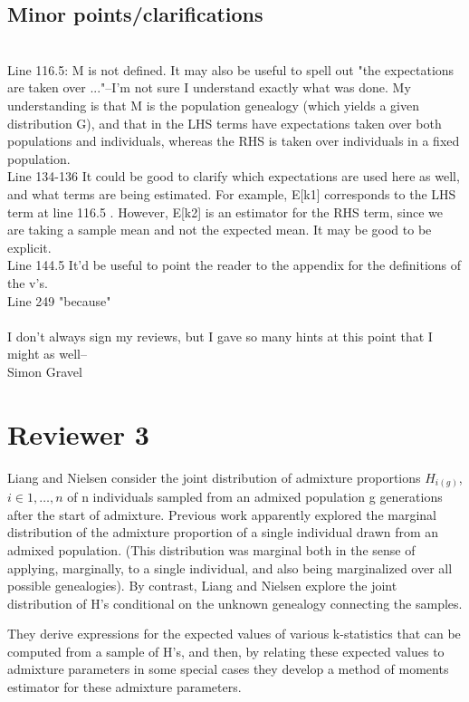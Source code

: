 \documentclass[11pt]{amsart}
\begin{document}
\subsection*{Minor points/clarifications}\ \\
Line 116.5: M is not defined. It may also be useful to spell out "the expectations are taken over ..."--I'm not
sure I understand exactly what was done. My understanding is that M is the population genealogy (which
yields a given distribution G), and that in the LHS terms have expectations taken over both populations and
individuals, whereas the RHS is taken over individuals in a fixed population.\\
Line 134-136
It could be good to clarify which expectations are used here as well, and what terms are being estimated.
For example, E[k1] corresponds to the LHS term at line 116.5 . However, E[k2] is an estimator for the RHS
term, since we are taking a sample mean and not the expected mean. It may be good to be explicit.\\
Line 144.5
It'd be useful to point the reader to the appendix for the definitions of the v's.\\
Line 249 "because"\\
\\
I don't always sign my reviews, but I gave so many hints at this point that I might as well--\\
Simon Gravel

\section{Reviewer 3}
Liang and Nielsen consider the joint distribution of admixture proportions $H_{i(g)}$, $i\in 1,\ldots, n$ of
n individuals sampled from an admixed population g generations after the start of admixture. Previous
work apparently explored the marginal distribution of the admixture proportion of a single individual
drawn from an admixed population. (This distribution was marginal both in the sense of applying,
marginally, to a single individual, and also being marginalized over all possible genealogies). By contrast,
Liang and Nielsen explore the joint distribution of H's conditional on the unknown genealogy connecting
the samples.

They derive expressions for the expected values of various k-statistics that can be computed from a
sample of H's, and then, by relating these expected values to admixture parameters in some special cases
they develop a method of moments estimator for these admixture parameters.
\end{document}
